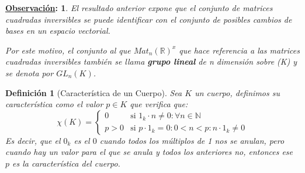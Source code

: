 \documentclass[10pt,a4paper,openright]{book}
\theoremstyle{break}
\newtheorem*{defi}{Definición}
\newtheorem*{obs}{\underline{Observación}:}
\begin{document}
\begin{obs}
El resultado anterior expone que el conjunto de matrices cuadradas inversibles se puede identificar con el conjunto de posibles cambios de bases en un espacio vectorial.

Por este motivo, el conjunto al que $Mat_n(\mathbb R)^x$ que hace referencia a las matrices cuadradas inversibles también se llama \textbf{grupo lineal} de \textit{n} dimensión sobre (K) y se denota por $GL_n(K)$.
\end{obs}

\begin{defi}[Característica de un Cuerpo]
Sea $K$ un cuerpo, definimos su característica como el valor $p\in K$ que verifica que:
$$\chi(K)=\begin{cases}0 & \mbox{si }1_k\cdot n\neq 0: \forall n\in \mathbb N \\
p>0 & \mbox{si }p\cdot 1_k=0: 0<n<p: n\cdot 1_k\neq 0\end{cases}$$
Es decir, que el $0_k$ es el $0$ cuando todos los múltiplos de 1 nos se anulan, pero cuando hay un valor para el que se anula y todos los anteriores no, entonces ese $p$ es la característica del cuerpo.
\end{defi}
\end{document}
